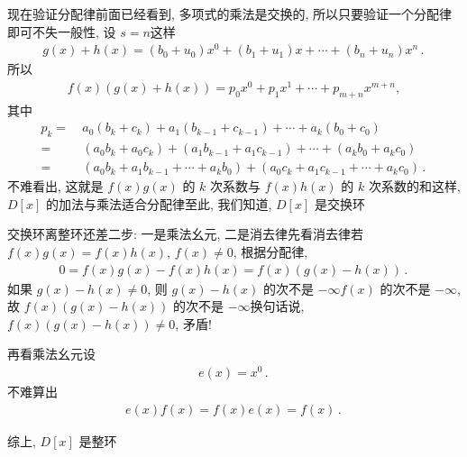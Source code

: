 \begin{pf}
    现在验证分配律\period 前面已经看到, 多项式的乘法是交换的, 所以只要验证一个分配律即可\period 不失一般性, 设 $s=n$\period 这样
    \begin{align*}
        g(x) + h(x) = (b_0 + u_0) x^0 + (b_1 + u_1) x + \cdots + (b_n + u_n) x^n \period
    \end{align*}
    所以
    \begin{align*}
        f(x) (g(x) + h(x)) = p_0 x^0 + p_1 x^1 + \cdots + p_{m+n} x^{m+n},
    \end{align*}
    其中
    \begin{align*}
        p_k
        = \  & a_0 (b_k + c_k) + a_1 (b_{k-1} + c_{k-1}) + \cdots + a_k (b_0 + c_0)                            \\
        = \  & (a_0 b_k + a_0 c_k) + (a_1 b_{k-1} + a_1 c_{k-1}) + \cdots + (a_k b_0 + a_k c_0)                \\
        = \  & (a_0 b_k + a_1 b_{k-1} + \cdots + a_k b_0) + (a_0 c_k + a_1 c_{k-1} + \cdots + a_k c_0) \period
    \end{align*}
    不难看出, 这就是 $f(x)g(x)$ 的 $k$ 次系数与 $f(x)h(x)$ 的 $k$ 次系数的和\period 这样, $D[x]$ 的加法与乘法适合分配律\period 至此, 我们知道, $D[x]$ 是交换环\period

    交换环离整环还差二步: 一是乘法幺元, 二是消去律\period 先看消去律\period 若 $f(x)g(x) = f(x)h(x)$, $f(x) \neq 0$, 根据分配律,
    \begin{align*}
        0 = f(x)g(x) - f(x)h(x) = f(x) (g(x) - h(x)) \period
    \end{align*}
    如果 $g(x) - h(x) \neq 0$, 则 $g(x) - h(x)$ 的次不是 $-\infty$\period $f(x)$ 的次不是 $-\infty$, 故 $f(x)(g(x) - h(x))$ 的次不是 $-\infty$\period 换句话说, $f(x)(g(x) - h(x)) \neq 0$, 矛盾!

    再看乘法幺元\period 设
    \begin{align*}
        e(x) = x^0 \period
    \end{align*}
    不难算出
    \begin{align*}
        e(x) f(x) = f(x) e(x) = f(x) \period
    \end{align*}

    综上, $D[x]$ 是整环\period
\end{pf}

